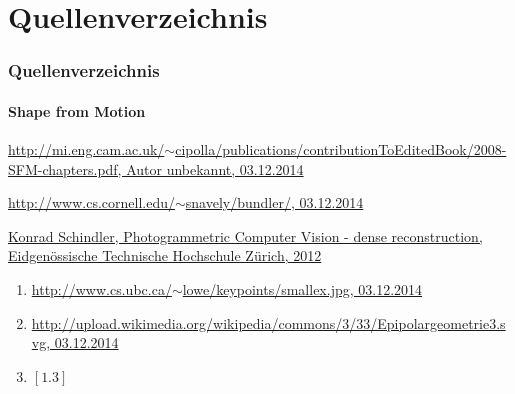 \documentclass{beamer}
\begin{document}
\section{Quellenverzeichnis}
\begin{frame}
	\frametitle{Quellenverzeichnis}
	\framesubtitle{Shape from Motion}
	
	\begin{tiny}
	\begin{enumerate}[label={[1.\arabic*]}]
		\item
		\href{http://mi.eng.cam.ac.uk/~cipolla/publications/contributionToEditedBook/2008-SFM-chapters.pdf}{http://mi.eng.cam.ac.uk/$\sim$cipolla/publications/contributionToEditedBook/2008-SFM-chapters.pdf, Autor unbekannt, 03.12.2014}
		\item
		\href{http://www.cs.cornell.edu/~snavely/bundler/}{http://www.cs.cornell.edu/$\sim$snavely/bundler/, 03.12.2014}
		\item
		\href{http://www.igp.ethz.ch/photogrammetry/education/lehrveranstaltungen/PCV_HS12/content_folder/PCV-HS2012-slides-multiview.pdf}{Konrad Schindler, Photogrammetric Computer Vision -  dense reconstruction, Eidgenössische Technische Hochschule Zürich, 2012}
	\end{enumerate}
	\vspace{1em}
	\begin{enumerate}[label={Fig. 1.\arabic*}]
		\item \href{http://www.cs.ubc.ca/~lowe/keypoints/smallex.jpg}{http://www.cs.ubc.ca/$\sim$lowe/keypoints/smallex.jpg, 03.12.2014}
		\item \href{http://upload.wikimedia.org/wikipedia/commons/3/33/Epipolargeometrie3.svg}{http://upload.wikimedia.org/wikipedia/commons/3/33/Epipolargeometrie3.svg, 03.12.2014}
		\item $\left[1.3\right]$
	\end{enumerate}
	\end{tiny}
\end{frame}
\end{document}

